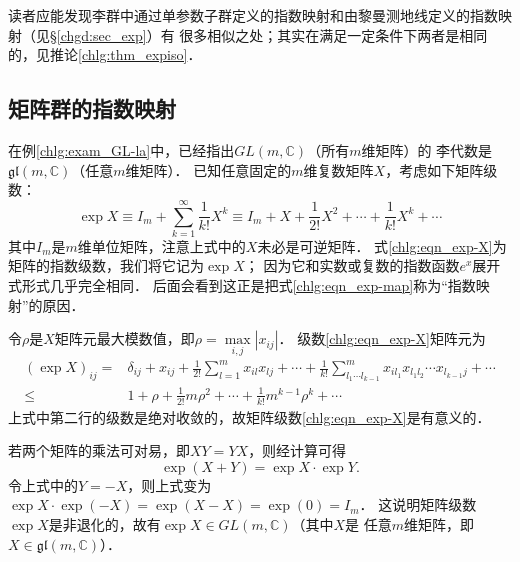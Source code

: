 读者应能发现李群中通过单参数子群定义的指数映射和由黎曼测地线定义的指数映射（见\S\ref{chgd:sec_exp}）有
很多相似之处；其实在满足一定条件下两者是相同的，见推论\ref{chlg:thm_expiso}．



\subsection{矩阵群的指数映射}\label{chlg:sec_GL-exp}

在例\ref{chlg:exam_GL-la}中，已经指出$GL(m,\mathbb{C})$（所有$m$维矩阵）的
李代数是$\mathfrak{gl}(m,\mathbb{C})$（任意$m$维矩阵）．
已知任意固定的$m$维复数矩阵$X$，考虑如下矩阵级数：
\begin{equation}\label{chlg:eqn_exp-X}
    \exp X \equiv I_m+\sum_{k=1}^{\infty} \frac{1}{k!}X^k \equiv 
    I_m + X + \frac{1}{2!} X^2 + \cdots +\frac{1}{k!} X^k + \cdots 
\end{equation}
其中$I_m$是$m$维单位矩阵，注意上式中的$X$未必是可逆矩阵．
式\eqref{chlg:eqn_exp-X}为矩阵的指数级数，我们将它记为$\exp X$；
因为它和实数或复数的指数函数$e^x$展开式形式几乎完全相同．
后面会看到这正是把式\eqref{chlg:eqn_exp-map}称为“{\heiti 指数映射}”的原因．


令$\rho$是$X$矩阵元最大模数值，即$\rho= \max\limits_{i,j} |x_{ij}|$．
级数\eqref{chlg:eqn_exp-X}矩阵元为
\begin{align*}
    (\exp X )_{ij} =& \delta_{ij} + x_{ij} + \frac{1}{2!} \sum_{l=1}^{m} x_{il} x_{lj}
     + \cdots + \frac{1}{k!} \sum_{l_1\cdots l_{k-1}}^{m} x_{il_1} x_{l_1 l_2} \cdots x_{l_{k-1} j}
     + \cdots \\
    \leqslant & 1 +\rho +  \frac{1}{2!} m \rho ^2+\cdots + \frac{1}{k!} m^{k-1} \rho^k + \cdots
\end{align*}
上式中第二行的级数是绝对收敛的，故矩阵级数\eqref{chlg:eqn_exp-X}是有意义的．


若两个矩阵的乘法可对易，即$XY=YX$，则经计算可得 %
\begin{equation}\label{chlg:eqn_tmp34}
    \exp(X+Y) = \exp X \cdot \exp Y . 
\end{equation}
令上式中的$Y=-X$，则上式变为$\exp X \cdot \exp (-X) = \exp(X-X) = \exp (0) = I_m$．
这说明矩阵级数$\exp X$是非退化的，故有$\exp X \in GL(m,\mathbb{C})$（其中$X$是
任意$m$维矩阵，即$X \in \mathfrak{gl}(m,\mathbb{C})$）．

